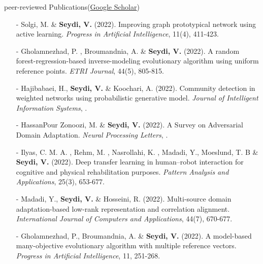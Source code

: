 \documentclass{resume} %
\begin{document}
\begin{rSection}{peer-reviewed Publications\small{(\href{https://scholar.google.com/citations?hl=en&user=L2z7NuwAAAAJ&view_op=list_works}{Google Scholar})}}
\begin{itemize}
\item[-] Solgi, M. \&  \textbf{Seydi, V.} \faEnvelopeO \hspace{1ex}  (2022). Improving graph prototypical network using active learning. \textit{Progress in Artificial Intelligence}, 11(4), 411-423.
\item[-] Gholamnezhad, P. , Broumandnia, A. \faEnvelopeO \hspace{1ex}  \& \textbf{Seydi, V.} (2022). A random forest-regression-based inverse-modeling evolutionary algorithm using uniform reference points. \textit{ETRI Journal}, 44(5), 805-815.
\item[-] Hajibabaei, H., \textbf{Seydi, V.} \faEnvelopeO \hspace{1ex}  \& Koochari, A. (2022). Community detection in weighted networks using probabilistic generative model. \textit{Journal of Intelligent Information Systems}, .
\item[-] HassanPour Zonoozi, M. \& \textbf{Seydi, V.} \faEnvelopeO \hspace{1ex}  (2022). A Survey on Adversarial Domain Adaptation. \textit{Neural Processing Letters}, .
\item[-] Ilyas, C. M. A. \faEnvelopeO \hspace{1ex} , Rehm, M. , Nasrollahi, K. , Madadi, Y., Moeslund, T. B \& \textbf{Seydi, V.} (2022). Deep transfer learning in human--robot interaction for cognitive and physical rehabilitation purposes. \textit{Pattern Analysis and Applications}, 25(3), 653-677.
\item[-] Madadi, Y., \textbf{Seydi, V.} \faEnvelopeO \hspace{1ex}  \& Hosseini, R. (2022). Multi-source domain adaptation-based low-rank representation and correlation alignment. \textit{International Journal of Computers and Applications}, 44(7), 670-677.
\item[-] Gholamnezhad, P., Broumandnia, A. \faEnvelopeO \hspace{1ex}  \& \textbf{Seydi, V.} (2022). A model-based many-objective evolutionary algorithm with multiple reference vectors. \textit{Progress in Artificial Intelligence}, 11, 251-268.

\end{itemize}
\end{rSection}
\end{document}
